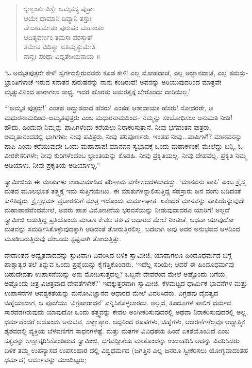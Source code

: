 \begin{verse}
ಶೃಣ್ವಂತು ವಿಶ್ವೇ ಅಮೃತಸ್ಯ ಪುತ್ರಾಃ\\ಆಯೇ ಧಾಮಾನಿ ದಿವ್ಯಾನಿ ತಸ್ತುಃ\\ವೇದಾಹಮೇತಂ ಪುರುಷಂ ಮಹಾಂತಂ\\ಆದಿತ್ಯವರ್ಣಂ ತಮಸಃ ಪರಸ್ತಾತ್​\\ತಮೇವ ವಿದಿತ್ವಾ ಅತಿಮೃತ್ಯುಮೇತಿ\\ನಾನ್ಯಃ ಪಂಥಾ ವಿದ್ಯತೇsಯನಾಯ ॥
\end{verse}

‘ಓ ಅಮೃತಪುತ್ರರೇ ಕೇಳಿ! ಸ್ವರ್ಗದಲ್ಲಿರುವವರು ಕೂಡ ಕೇಳಿ! ಎಲ್ಲ ಮೋಹದಾಚೆ, ಎಲ್ಲ ಅಜ್ಞಾನದಾಚೆ, ಎಲ್ಲ ತಮಸ್ಸು-ಭ್ರಾಂತಿಗಳಾಚೆ ಇರುವ ಸನಾತನ ಪುರುಷನನ್ನು ನಾನು ಕಂಡಿರುವೆ! ಅವನನ್ನು ಅರಿಯುವುದರಿಂದ ಮಾತ್ರವೇ ಮೃತ್ಯುವಿನಿಂದ ಪಾರಾಗಲು ಸಾಧ್ಯ. ಇದರ ಹೊರತು ಅಮರತ್ವಕ್ಕೆ ಬೇರೊಂದು ದಾರಿಯಿಲ್ಲ.’

“‘ಅಮೃತ ಪುತ್ರರು!’ ಎಂತಹ ಅದ್ಭುತವಾದ ಹೆಸರು! ಎಂತಹ ಆಶಾದಾಯಕ ಹೆಸರು! ಸೋದರರೇ, ಆ ಮಧುರನಾಮದಿಂದ–ಅಮೃತಪುತ್ರರು ಎಂಬ ಮಧುರನಾಮದಿಂದ– ನಿಮ್ಮನ್ನು ಸಂಬೋಧಿಸಲು ಅನುಮತಿ ನೀಡಿ! ಹೌದು, ಹಿಂದುವು ನಿಮ್ಮನ್ನು ಪಾಪಿಗಳೆಂದು ಕರೆಯಲು ನಿರಾಕರಿಸುತ್ತಾನೆ. ನೀವು ಭಗವಂತನ ಪುತ್ರರು, ಅಮೃತಾನಂದದಲ್ಲಿ ಭಾಗಿಗಳು; ನೀವು ಪವಿತ್ರರು, ನೀವು ಪರಿಪೂರ್ಣರು. ಇಂತಹ ನೀವು...ಪಾಪಿಗಳೆ!? ಮಾನವನನ್ನು ಪಾಪಿ ಎಂದು ಕರೆಯುವುದೇ ಒಂದು ಮಹಾಪಾಪ! ಮಾನವನ ಸ್ವಭಾವಕ್ಕೆ ಒಂದು ಮಹಾಕಳಂಕ! ಮೇಲೆದ್ದು ಬನ್ನಿ, ಓ ವೀರಕೇಸರಿಗಳೇ; ನೀವು ಕುರಿಗಳೆಂದೆಂಬ ಭ್ರಾಂತಿಯನ್ನು ಕೊಡಹಿ. ನೀವು ಪ್ರಕೃತಿಯಲ್ಲ. ನೀವು ದೇಹವಲ್ಲ. ಪ್ರಕೃತಿ ನಿಮ್ಮ ಅಡಿಯಾಳು, ನೀವು ಪ್ರಕೃತಿಯ ಅಡಿಯಾಳಲ್ಲ.”

ಸ್ವಾಮೀಜಿಯ ಈ ಮಾತುಗಳು ಉಂಟುಮಾಡಿದ ಪರಿಣಾಮ ವರ್ಣಿಸಲದಳವಾದದ್ದು. ‘ಮಾನವನು ಪಾಪಿ’ ಎಂಬ ಕ್ರೈಸ್ತ ಮತದ ಮೂಲಭೂತ ತತ್ತ್ವಕ್ಕೆ ಇದು ಸುತ್ತಿಗೆಯೇಟು. ಈ ಮಾತುಗಳನ್ನಾಲಿಸುತ್ತಿದ್ದ ಸಹಸ್ರಾರು ಜನ ದಂಗು ಬಡಿದಂತೆ ಕುಳಿತಿದ್ದರು. ಕ್ರೈಸ್ತಧರ್ಮ ಪ್ರಚಾರಕರಿಗೆ ಮಾತ್ರ ಇದೊಂದು ಮರ್ಮಾಘಾತ. ಏಕೆಂದರೆ ಮಾನವನ್ನು ಪಾಪಿಯೆನ್ನುವುದೇ ಮಹಾಪಾಪವೆಂದಮೇಲೆ, ಅವರು ಪಾಪ ವಿಮೋಚನೆಯ ಭರವಸೆಯನ್ನು ನೀಡುವುದಾದರೂ ಯಾರಿಗೆ! ಅಲ್ಲದೆ ಸ್ವಾಮೀಜಿ ಆಡುತ್ತಿದ್ದ ಪ್ರತಿಯೊಂದು ಮಾತೂ ಕೇವಲ ತರ್ಕದ ಆಧಾರದ ಮೇಲೆ ನಿಂತಂತೆ, ಅಥವಾ ಯಾವುದೋ ಮತವನ್ನು ಸಮರ್ಥಿಸಿಕೊಳ್ಳುವುದಕ್ಕಾಗಿ ಆಡಿದಂತೆ ತೋರುತ್ತಿರಲಿಲ್ಲ. ಬದಲಾಗಿ ಅವು ಅವರ ಅನುಭವದ ಆಳದಿಂದ ಮೂಡಿಬರುತ್ತಿರುವು ದೆಂಬುದು ಸ್ಪಷ್ಟವಾಗಿ ತೋರುತ್ತಿತ್ತು.

ವೇದಾಂತದ ಅದ್ವೈತವಾದವನ್ನು ಸ್ಫುಟವಾಗಿ ವಿವರಿಸಿದ ಬಳಿಕ ಸ್ವಾಮೀಜಿ, ಯಾವಾಗಲೂ ಹಿಂದೂಧರ್ಮದ ಬಗ್ಗೆ ಪಾಶ್ಚಾತ್ಯರ ತಲೆ ತಿನ್ನುವ ಒಂದು ಪ್ರಶ್ನೆಯನ್ನು ಕೈಗೆತ್ತಿಕೊಂಡರು. ‘ಇದೆಲ್ಲ ಸರಿಯೇ; ಆದರೆ ಈ ಹಿಂದೂಧರ್ಮವು ಬಹುದೇವತಾ ಉಪಾಸನೆಯನ್ನು ಅನು ಮೋದಿಸುತ್ತದಲ್ಲ? ಒಬ್ಬನೇ ದೇವರೆಂದ ಮೇಲೆ ಅಷ್ಟೊಂದು ಬಗೆಯ, ಅಷ್ಟೊಂದು ಚಿತ್ರ ವಿಚಿತ್ರವಾದ ದೇವತೆಗಳೇಕೆ?’ ಇದಕ್ಕುತ್ತರವಾಗಿ ಸ್ವಾಮೀಜಿ, ಕೆಳಮಟ್ಟದ ಧಾರ್ಮಿಕ ಭಾವನೆಗಳ ಮತ್ತು ಉಪಾಸನೆಗಳ ಆವಶ್ಯಕತೆಯನ್ನು ಮನೋವಿಜ್ಞಾನದ ಆಧಾರದ ಮೇಲೆ ವಿವರಿಸಿದರು. ವಿಗ್ರಹವು ದೈವತ್ವದ ಚಿಹ್ನೆಯಾದಾಗ, ಆ ಪೂಜೆಯು ‘ವಿಗ್ರಹಾರಾಧನೆ’ ಎನ್ನಿಸಿಕೊಳ್ಳಲಾರದು. ಅಲ್ಲದೆ, ಹಿಂದೂಗಳ ಪಾಲಿಗೆ ಧರ್ಮದ ಸಾರವಡಗಿರುವುದು ಯಾವುದೋ ಒಂದು ತತ್ತ್ವವನ್ನು ಕೇವಲ ಅಂಗೀಕರಿಸುವುದರಲ್ಲಿ ಅಥವಾ ನಿರಾಕರಿಸುವುದರಲ್ಲಿ ಅಲ್ಲ. ಧರ್ಮವೆಂದರೆ ಅದೊಂದು ಅನುಭವ, ಸಾಕ್ಷಾತ್ಕಾರ. ಆದ್ದರಿಂದ ರೂಪಗಳು, ಚಿಹ್ನೆಗಳು, ಆಚರಣೆಗಳೆಲ್ಲವೂ ಆಧ್ಯಾತ್ಮಿಕ ಶೈಶವದಲ್ಲಿ ವ್ಯಕ್ತಿಯ ಬೆಳವಣಿಗೆಗೆ ಸಾಧನಗಳಷ್ಟೆ. ಮತ್ತು ಮತಗಳ ವಿವಿಧತೆಯ ಹಿಂದೆ ಏಕತೆಯೊಂದಿದೆ ಎಂಬ ಸತ್ಯವನ್ನು ಸಾಕ್ಷಾತ್ಕರಿಸಿಕೊಂಡಿರುವ ಸ್ವಾಮೀಜಿ, ಭಗವದ್ಗೀತೆಯ ಮಾತೊಂದನ್ನು ಉದಾಹರಿಸಿ ಅದನ್ನು ವಿವರಿಸಿದರು. ಬಳಿಕ ತಮ್ಮ ಉಪನ್ಯಾಸದ ಉಪಸಂಹಾರ ದಲ್ಲಿ ವಿಶ್ವಧರ್ಮದ (ಜಗತ್ತಿನ ಎಲ್ಲ ಜನರೂ ಸ್ವೀಕರಿಸಲು ಯೋಗ್ಯವಾದಂತಹ ಧರ್ಮದ) ಆದರ್ಶವನ್ನು ಮುಂದಿಟ್ಟರು;

